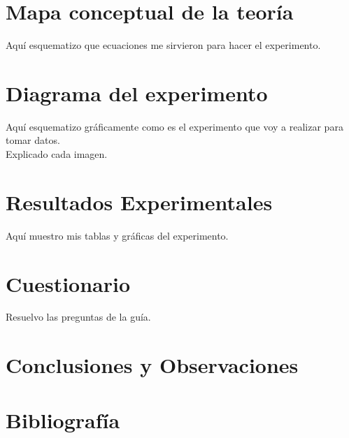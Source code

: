 \documentclass[a4paper,11pt]{article}
\begin{document}
\section{Mapa conceptual de la teoría}
\noindent
Aquí esquematizo que ecuaciones me sirvieron para hacer el experimento.\\

\section{Diagrama del experimento}

\noindent
Aquí esquematizo gráficamente como es el experimento que voy a realizar  para tomar datos.\\
Explicado cada imagen.\\

\section{Resultados Experimentales}
\noindent 
Aquí muestro mis tablas y gráficas del experimento.\\

\section{Cuestionario}
\noindent
Resuelvo las preguntas de la guía.\\

\section{Conclusiones y Observaciones}

\section{Bibliografía}
\end{document}
